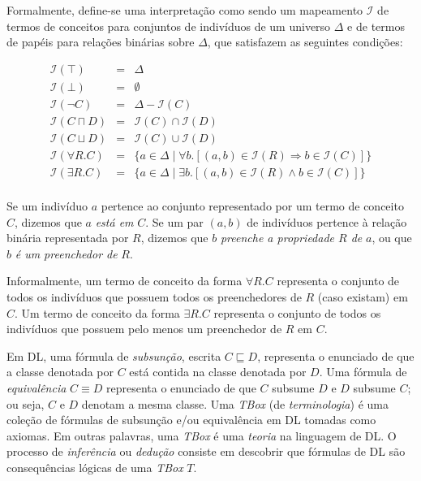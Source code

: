 \documentclass[hyphens,11pt,a4paper]{article}
\newcommand{\dland}{\sqcap}         %
\newcommand{\dlor}{\sqcup}       %
\newcommand{\subs}{\sqsubseteq}  %
\begin{document}
		Formalmente, define-se uma interpretação como sendo um mapeamento $\mathcal{I}$ de termos de conceitos para conjuntos de indivíduos de um universo $\Delta$ e de termos de papéis para relações binárias sobre $\Delta$, que satisfazem as seguintes condições:
\begin{small}		
		\[
		 \begin{array}{rcl}
				\mathcal{I}(\top)             & = & \Delta   \\
				\mathcal{I}(\bot)             & = & \emptyset \\
				\mathcal{I}(\neg C)           & = & \Delta - \mathcal{I}(C) \\
				\mathcal{I}(C \dland D)    & = & \mathcal{I}(C) \cap \mathcal{I}(D)  \\
				\mathcal{I}(C \dlor D)     & = & \mathcal{I}(C) \cup \mathcal{I}(D)  \\
				\mathcal{I}(\forall R.C)   & = & \{ a \in \Delta \mid \forall b. [(a,b) \in 
																												\mathcal{I}(R) \Rightarrow b \in \mathcal{I}(C)] \}   \\
				\mathcal{I}(\exists R.C)   & = & \{ a \in \Delta \mid \exists b. [(a,b) \in 
																												\mathcal{I}(R) \land b \in \mathcal{I}(C)] \}   \\
		 \end{array}
		\]
\end{small}
Se um indivíduo $a$ pertence ao conjunto representado por um termo de conceito $C$, dizemos que $a$ \emph{está em} $C$. Se um par $(a, b)$ de indivíduos pertence à relação binária representada por $R$, dizemos que $b$ \emph{preenche a propriedade $R$ de} $a$, ou que $b$ \emph{é um preenchedor de} $R$. 

		Informalmente, um termo de conceito da forma $\forall R.C$ representa o conjunto de todos os indivíduos que possuem todos os preenchedores de $R$ (caso existam) em $C$. Um termo de conceito da forma $\exists R.C$ representa o conjunto de todos os indivíduos que possuem pelo menos um preenchedor de $R$ em $C$.

		Em DL, uma fórmula de \emph{subsunção}, escrita $C \subs D$, representa o enunciado de que a classe denotada por $C$ está contida na classe denotada por $D$. Uma fórmula de \emph{equivalência} $C \equiv D$ representa o enunciado de que $C$ subsume $D$ e $D$ subsume $C$; ou seja, $C$ e $D$ denotam a mesma classe. 
		Uma \emph{TBox} (de \emph{terminologia}) é uma coleção de fórmulas de subsunção e/ou equivalência em DL tomadas como axiomas. Em outras palavras, uma \emph{TBox} é uma \emph{teoria} na linguagem de DL. O processo de \emph{inferência} ou  \emph{dedução} consiste em descobrir que fórmulas de DL são consequências lógicas de uma \emph{TBox} $T$. 
\end{document}
